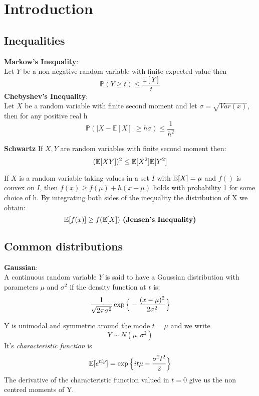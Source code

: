 \chapter{Introduction}
\label{cha:intro}
\vspace{15pt}




\section{Inequalities}
\label{sec:inequalities}
\vspace{10pt}
\textbf{Markow's Inequality}:\\
Let $Y$ be a non negative random variable with finite expected value then
$$ \mathbb{P}(Y \geq t)\leq \frac{\mathbb{E}[Y]}{t}$$
\textbf{Chebyshev's Inequality}:\\
Let $X$ be a random variable with finite second moment and let $\sigma=\sqrt{Var(x)}$, then for any positive real h
\begin{equation}\label{eq:Chebyshev}
	\mathbb{P}(|X-\mathbb{E}[X]|\geq h\sigma)\leq \frac{1}{h^2}
\end{equation}
\begin{teo}\textbf{Schwartz}
If $X,Y$ are random variables with finite second moment then:
$$ ( \mathbb{E} [XY])^2 \leq \mathbb{E} [X^2] \mathbb{E} [Y^2]$$
\end{teo}

If $X$ is a random variable taking values in a set $I$ with $\mathbb{E} [X]=\mu$  and $f()$ is convex on $I$, then $f(x)\geq f(\mu) + h(x-\mu)$ holds with probability 1 for some choice of h.
By integrating both sides of the inequality \wrt the distribution of X we obtain:
$$\mathbb{E} [f(x)]\geq f(\mathbb{E} [X]) \textbf{     (Jensen's Inequality)}$$

\section{Common distributions}
\label{sec:dist}
\textbf{Gaussian}:\\
A continuous random variable $Y$ is said to have a Gaussian distribution with parameters $\mu$ and $\sigma ^ 2$ if the density function at $t$ is:
$$\frac{1}{\sqrt{2\pi \sigma ^2}} \exp \Big\{ - \frac{(x-\mu)^2}{2 \sigma^2} \Big\}$$


Y is unimodal and symmetric around the mode $t=\mu$ and we write
$$Y \sim  N(\mu , \sigma ^2)$$
It's \textit{characteristic function} is
$$\mathbb{E} [e^{ tiy }]=\exp \Big\{ it \mu -\frac{\sigma ^2 t ^2}{2} \Big\}$$
The derivative of  the characteristic function valued in $t=0$ give us the non centred moments of Y.\\

